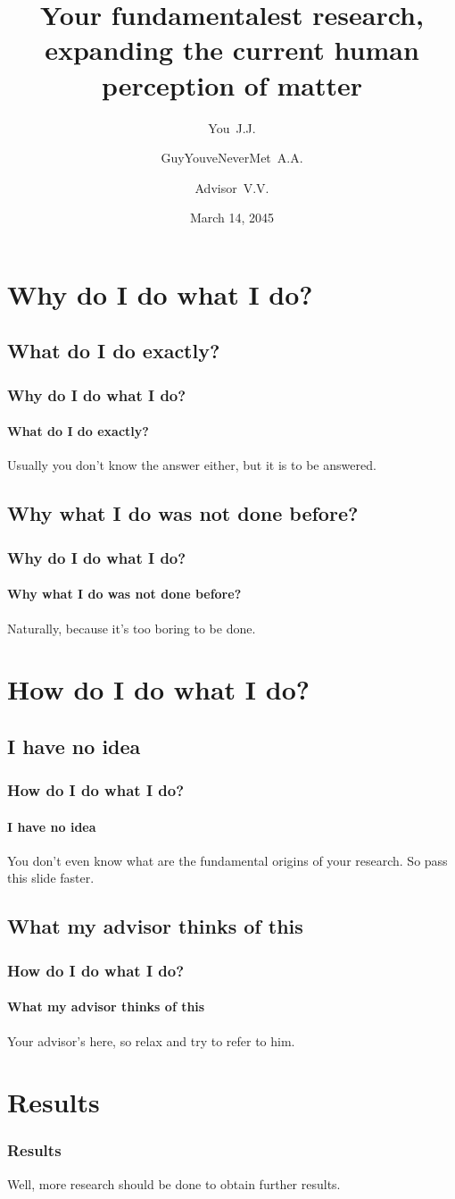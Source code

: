 \documentclass{beamer}
\title{Your fundamentalest research, expanding the current human perception of matter}
\author{You~J.J. \and GuyYouveNeverMet~A.A. \and Advisor~V.V.}
\date{March 14, 2045} %
\begin{document}
\frame{\titlepage}
\frame{\tableofcontents}
\section{Why do I do what I do?}
\subsection{What do I do exactly?}
\frame
{
\frametitle{Why do I do what I do?}
\framesubtitle{What do I do exactly?}
Usually you don't know the answer either, but it is to be answered.
}
\subsection{Why what I do was not done before?}
\frame
{
\frametitle{Why do I do what I do?}
\framesubtitle{Why what I do was not done before?}
Naturally, because it's too boring to be done.
}
\section{How do I do what I do?}
\subsection{I have no idea}
\frame
{
\frametitle{How do I do what I do?}
\framesubtitle{I have no idea}
You don't even know what are the fundamental origins of your research. So pass this slide faster.
}
\subsection{What my advisor thinks of this}
\frame
{
\frametitle{How do I do what I do?}
\framesubtitle{What my advisor thinks of this}
Your advisor's here, so relax and try to refer to him.
}
\section{Results}
\frame
{
\frametitle{Results}
Well, more research should be done to obtain further results.
}
\end{document}
